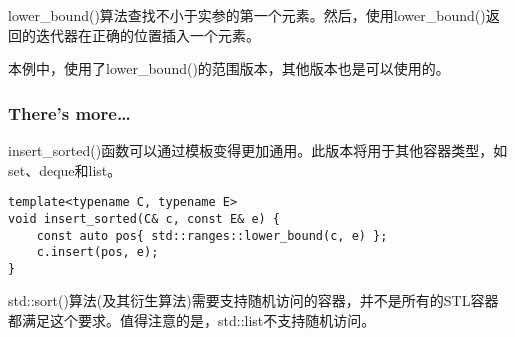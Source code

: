 lower\_bound()算法查找不小于实参的第一个元素。然后，使用lower\_bound()返回的迭代器在正确的位置插入一个元素。

本例中，使用了lower\_bound()的范围版本，其他版本也是可以使用的。

\subsubsection{There's more…}

insert\_sorted()函数可以通过模板变得更加通用。此版本将用于其他容器类型，如set、deque和list。

\begin{lstlisting}[style=styleCXX]
template<typename C, typename E>
void insert_sorted(C& c, const E& e) {
	const auto pos{ std::ranges::lower_bound(c, e) };
	c.insert(pos, e);
}
\end{lstlisting}

std::sort()算法(及其衍生算法)需要支持随机访问的容器，并不是所有的STL容器都满足这个要求。值得注意的是，std::list不支持随机访问。



















